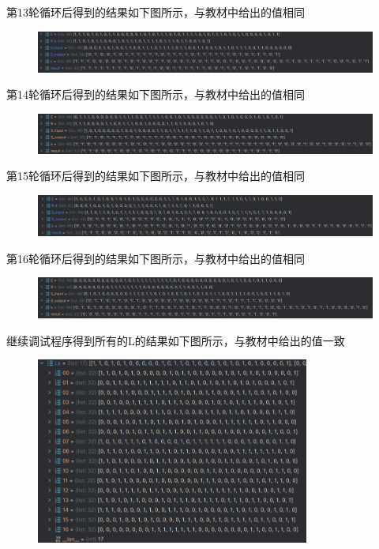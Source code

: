 \documentclass[a4paper,11pt,UTF8]{ctexart}
\newcommand{\bottomcaption}{%
\setlength{\abovecaptionskip}{6pt}%
\setlength{\belowcaptionskip}{6pt}%
\caption}
\newcommand{\xiaowuhao}{\fontsize{9pt}{\baselineskip}\selectfont}   %
\begin{document}
            第13轮循环后得到的结果如下图所示，与教材中给出的值相同
            \begin{figure}[H]
                \centering
                \includegraphics[width=15cm]{dN13.png}
                \bottomcaption{\xiaowuhao{第13轮循环的结果}}
            \end{figure}
            第14轮循环后得到的结果如下图所示，与教材中给出的值相同
            \begin{figure}[H]
                \centering
                \includegraphics[width=15cm]{dN14.png}
                \bottomcaption{\xiaowuhao{第14轮循环的结果}}
            \end{figure}
            第15轮循环后得到的结果如下图所示，与教材中给出的值相同
            \begin{figure}[H]
                \centering
                \includegraphics[width=15cm]{dN15.png}
                \bottomcaption{\xiaowuhao{第15轮循环的结果}}
            \end{figure}
            第16轮循环后得到的结果如下图所示，与教材中给出的值相同
            \begin{figure}[H]
                \centering
                \includegraphics[width=15cm]{dN16.png}
                \bottomcaption{\xiaowuhao{第16轮循环的结果}}
            \end{figure}
\newpage
            继续调试程序得到所有的L的结果如下图所示，与教材中给出的值一致
            \begin{figure}[H]
                \centering
                \includegraphics[width=9cm]{dL.png}
                \bottomcaption{\xiaowuhao{L的值}}
            \end{figure}
\end{document}
